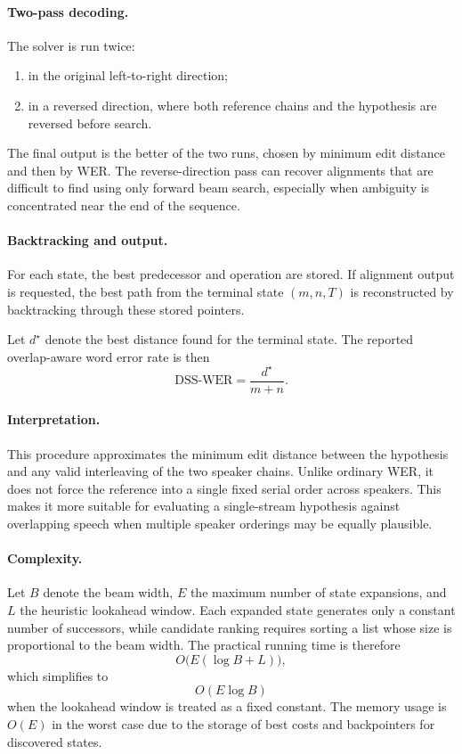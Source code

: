\paragraph{Two-pass decoding.}
The solver is run twice:
\begin{enumerate}
    \item in the original left-to-right direction;
    \item in a reversed direction, where both reference chains and the hypothesis are reversed before search.
\end{enumerate}
The final output is the better of the two runs, chosen by minimum edit distance and then by WER. The reverse-direction pass can recover alignments that are difficult to find using only forward beam search, especially when ambiguity is concentrated near the end of the sequence.

\paragraph{Backtracking and output.}
For each state, the best predecessor and operation are stored. If alignment output is requested, the best path from the terminal state \((m,n,T)\) is reconstructed by backtracking through these stored pointers.

Let \(d^\star\) denote the best distance found for the terminal state. The reported overlap-aware word error rate is then
\begin{equation}
\mathrm{DSS\mbox{-}WER} = \frac{d^\star}{m+n}.
\end{equation}

\paragraph{Interpretation.}
This procedure approximates the minimum edit distance between the hypothesis and any valid interleaving of the two speaker chains. Unlike ordinary WER, it does not force the reference into a single fixed serial order across speakers. This makes it more suitable for evaluating a single-stream hypothesis against overlapping speech when multiple speaker orderings may be equally plausible.

\paragraph{Complexity.}
Let \(B\) denote the beam width, \(E\) the maximum number of state expansions, and \(L\) the heuristic lookahead window. Each expanded state generates only a constant number of successors, while candidate ranking requires sorting a list whose size is proportional to the beam width. The practical running time is therefore
\begin{equation}
O\!\bigl(E(\log B + L)\bigr),
\end{equation}
which simplifies to
\begin{equation}
O(E \log B)
\end{equation}
when the lookahead window is treated as a fixed constant. The memory usage is \(O(E)\) in the worst case due to the storage of best costs and backpointers for discovered states.

